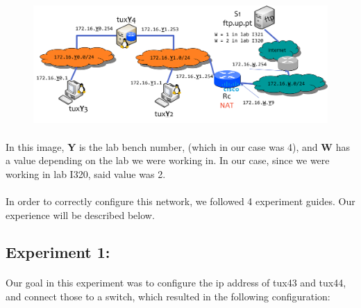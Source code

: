 \documentclass[11pt]{article}
\begin{document}
\begin{figure}[h]
\includegraphics[scale=0.6]{images/net-complete.png}
\centering
\end{figure}

\paragraph{}In this image, \textbf{Y} is the lab bench number, (which in our case was 4), and \textbf{W} has a value depending on the lab we were working in. In our case, since we were working in lab I320, said value was 2.

\paragraph{}In order to correctly configure this network, we followed 4 experiment guides. Our experience will be described below.

\subsection*{Experiment 1:}

\paragraph{}Our goal in this experiment was to configure the ip address of tux43 and tux44, and connect those to a switch, which resulted in the following configuration:
\end{document}
